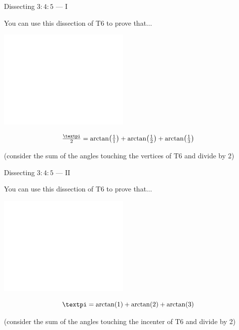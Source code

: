 \documentclass[14pt]{beamer}
\begin{document}
    \begin{frame}{Dissecting $3\!\!:\!\!4\!\!:\!\!5$ --- I}
        \begin{center}
            You can use this dissection of T6 to prove that...

            \bigskip\bigskip

            \includegraphics[height=18ex]{figures/figure006c.pdf}\vspace{-1em}

            $$\tfrac{\text{\textpi}}{2} = \arctan{\!\left(\tfrac{1}{1}\right)} + \arctan{\!\left(\tfrac{1}{2}\right)} + \arctan{\!\left(\tfrac{1}{3}\right)}$$

            {\footnotesize(consider the sum of the angles touching the vertices of T6 and divide by 2)}
        \end{center}
    \end{frame}


    \begin{frame}{Dissecting $3\!\!:\!\!4\!\!:\!\!5$ --- II}
        \begin{center}
            You can use this dissection of T6 to prove that...

            \bigskip\bigskip

            \includegraphics[height=18ex]{figures/figure006c.pdf}\vspace{-1em}

            $$\text{\textpi} = \arctan{\!\left(1\right)} + \arctan{\!\left(2\right)} + \arctan{\!\left(3\right)}$$

            {\footnotesize(consider the sum of the angles touching the incenter of T6 and divide by 2)}
        \end{center}
    \end{frame}
\end{document}
